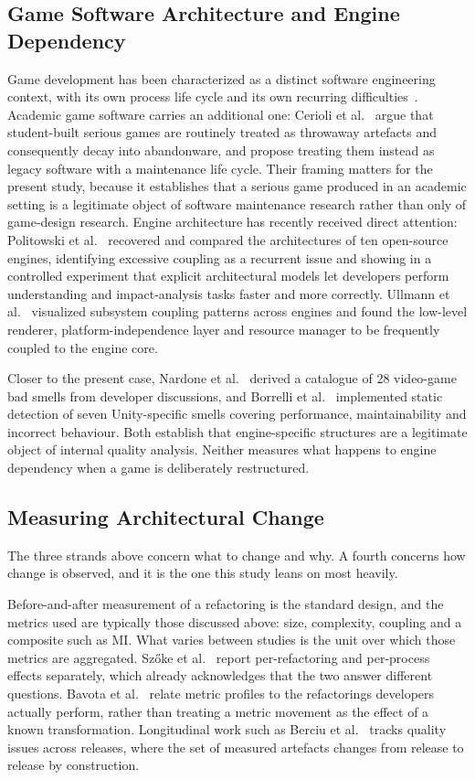 \documentclass{sbc2019}%
\begin{document}
\subsection{Game Software Architecture and Engine Dependency}

Game development has been characterized as a distinct software engineering
context, with its own process life cycle and its own recurring difficulties~\cite{aleem2016}. Academic game software carries an additional one: Cerioli et
al.\ \cite{cerioli2026} argue that student-built serious games are routinely
treated as throwaway artefacts and consequently decay into abandonware, and
propose treating them instead as legacy software with a maintenance life cycle.
Their framing matters for the present study, because it establishes that a serious
game produced in an academic setting is a legitimate object of software
maintenance research rather than only of game-design research. Engine architecture has recently received direct attention:
Politowski et al.\ \cite{politowski2025} recovered and compared the
architectures of ten open-source engines, identifying excessive coupling as a
recurrent issue and showing in a controlled experiment that explicit
architectural models let developers perform understanding and impact-analysis
tasks faster and more correctly. Ullmann et al.\ \cite{ullmann2023} visualized
subsystem coupling patterns across engines and found the low-level renderer,
platform-independence layer and resource manager to be frequently coupled to
the engine core.

Closer to the present case, Nardone et al.\ \cite{nardone2023} derived a
catalogue of 28 video-game bad smells from developer discussions, and Borrelli
et al.\ \cite{borrelli2020} implemented static detection of seven Unity-specific
smells covering performance, maintainability and incorrect behaviour. Both
establish that engine-specific structures are a legitimate object of internal
quality analysis. Neither measures what happens to engine dependency when a
game is deliberately restructured.

\subsection{Measuring Architectural Change}

The three strands above concern what to change and why. A fourth concerns how
change is observed, and it is the one this study leans on most heavily.

Before-and-after measurement of a refactoring is the standard design, and the
metrics used are typically those discussed above: size, complexity, coupling and
a composite such as MI\@. What varies between studies is the unit over which
those metrics are aggregated. Sz\H{o}ke et al.~\cite{szoke2017} report
per-refactoring and per-process effects separately, which already acknowledges
that the two answer different questions. Bavota et al.~\cite{bavota2015} relate
metric profiles to the refactorings developers actually perform, rather than
treating a metric movement as the effect of a known transformation. Longitudinal
work such as Berciu et al.~\cite{berciu2026} tracks quality issues across
releases, where the set of measured artefacts changes from release to release by
construction.
\end{document}
